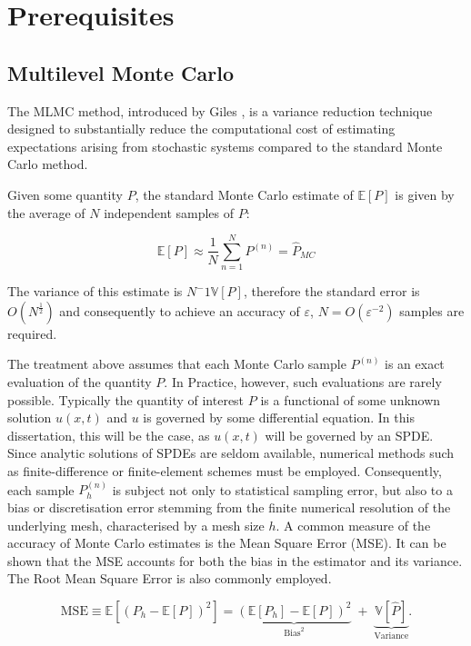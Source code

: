 \section{Prerequisites}

\subsection{Multilevel Monte Carlo}

The MLMC method, introduced by Giles \cite{giles2008multilevel}, is a variance reduction technique
designed to substantially reduce the computational cost of estimating expectations arising from stochastic systems
compared to the standard Monte Carlo method.

Given some quantity $P$, the standard Monte Carlo estimate of $\mathbb{E}\left[P\right]$ 
is given by the average of $N$ independent samples of $P$:

\begin{equation*}
    \mathbb{E}\left[P\right] \approx \frac{1}{N} \sum_{n=1}^{N} P^{(n)} = \hat{P}_{MC}
\end{equation*}

The variance of this estimate is $N^-1 \mathbb{V}\left[P\right]$, therefore the standard error is 
$O(N^{\frac{1}{2}})$ and consequently to achieve an accuracy of $\varepsilon$, $N = O(\varepsilon^{-2})$ samples 
are required.

The treatment above assumes that each Monte Carlo sample $P^{(n)}$ is an exact evaluation of the quantity $P$.
In Practice, however, such evaluations are rarely possible. Typically the quantity of interest $P$ is a functional
of some unknown solution $u(x,t)$ and $u$ is governed by some differential
equation. In this dissertation, this will be 
the case, as $u(x,t)$ will be governed by an SPDE. Since analytic solutions of SPDEs are seldom available, 
numerical methods such as finite-difference or finite-element schemes must be employed. Consequently,
each sample $P_h^{(n)}$ is subject not only to statistical sampling error, but also to a bias or discretisation error
stemming from the finite numerical resolution of the underlying mesh, characterised by a mesh size $h$.
A common measure of the accuracy of Monte Carlo estimates is the Mean  Square Error (MSE). It can be shown that 
the MSE accounts for both the bias in the estimator and its variance. The Root Mean Square Error is also 
commonly employed.


\begin{equation}\label{eq:MSE}
    \text{MSE} \equiv \mathbb{E}\left[(P_h - \mathbb{E}\left[P\right])^2\right] 
    = \underbrace{(\mathbb{E}[P_h] - \mathbb{E}[P])^2}_{\text{Bias}^2}
    \;+\;
    \underbrace{\mathbb{V}[\hat{P}]}_{\text{Variance}}.
\end{equation}

